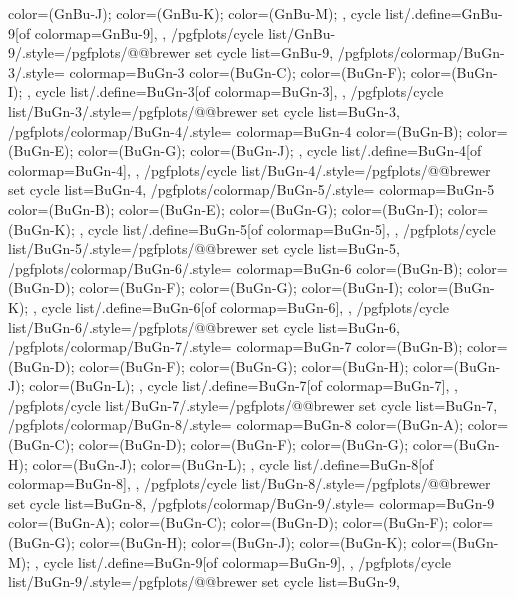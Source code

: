 {{{      color=(GnBu-J);
      color=(GnBu-K);
      color=(GnBu-M);
    },
    cycle list/.define={GnBu-9}{[of colormap=GnBu-9]},
  },
  /pgfplots/cycle list/GnBu-9/.style={/pgfplots/@@brewer set cycle list={GnBu-9}},
  /pgfplots/colormap/BuGn-3/.style={
    colormap={BuGn-3}{
      color=(BuGn-C);
      color=(BuGn-F);
      color=(BuGn-I);
    },
    cycle list/.define={BuGn-3}{[of colormap=BuGn-3]},
  },
  /pgfplots/cycle list/BuGn-3/.style={/pgfplots/@@brewer set cycle list={BuGn-3}},
  /pgfplots/colormap/BuGn-4/.style={
    colormap={BuGn-4}{
      color=(BuGn-B);
      color=(BuGn-E);
      color=(BuGn-G);
      color=(BuGn-J);
    },
    cycle list/.define={BuGn-4}{[of colormap=BuGn-4]},
  },
  /pgfplots/cycle list/BuGn-4/.style={/pgfplots/@@brewer set cycle list={BuGn-4}},
  /pgfplots/colormap/BuGn-5/.style={
    colormap={BuGn-5}{
      color=(BuGn-B);
      color=(BuGn-E);
      color=(BuGn-G);
      color=(BuGn-I);
      color=(BuGn-K);
    },
    cycle list/.define={BuGn-5}{[of colormap=BuGn-5]},
  },
  /pgfplots/cycle list/BuGn-5/.style={/pgfplots/@@brewer set cycle list={BuGn-5}},
  /pgfplots/colormap/BuGn-6/.style={
    colormap={BuGn-6}{
      color=(BuGn-B);
      color=(BuGn-D);
      color=(BuGn-F);
      color=(BuGn-G);
      color=(BuGn-I);
      color=(BuGn-K);
    },
    cycle list/.define={BuGn-6}{[of colormap=BuGn-6]},
  },
  /pgfplots/cycle list/BuGn-6/.style={/pgfplots/@@brewer set cycle list={BuGn-6}},
  /pgfplots/colormap/BuGn-7/.style={
    colormap={BuGn-7}{
      color=(BuGn-B);
      color=(BuGn-D);
      color=(BuGn-F);
      color=(BuGn-G);
      color=(BuGn-H);
      color=(BuGn-J);
      color=(BuGn-L);
    },
    cycle list/.define={BuGn-7}{[of colormap=BuGn-7]},
  },
  /pgfplots/cycle list/BuGn-7/.style={/pgfplots/@@brewer set cycle list={BuGn-7}},
  /pgfplots/colormap/BuGn-8/.style={
    colormap={BuGn-8}{
      color=(BuGn-A);
      color=(BuGn-C);
      color=(BuGn-D);
      color=(BuGn-F);
      color=(BuGn-G);
      color=(BuGn-H);
      color=(BuGn-J);
      color=(BuGn-L);
    },
    cycle list/.define={BuGn-8}{[of colormap=BuGn-8]},
  },
  /pgfplots/cycle list/BuGn-8/.style={/pgfplots/@@brewer set cycle list={BuGn-8}},
  /pgfplots/colormap/BuGn-9/.style={
    colormap={BuGn-9}{
      color=(BuGn-A);
      color=(BuGn-C);
      color=(BuGn-D);
      color=(BuGn-F);
      color=(BuGn-G);
      color=(BuGn-H);
      color=(BuGn-J);
      color=(BuGn-K);
      color=(BuGn-M);
    },
    cycle list/.define={BuGn-9}{[of colormap=BuGn-9]},
  },
  /pgfplots/cycle list/BuGn-9/.style={/pgfplots/@@brewer set cycle list={BuGn-9}},
}
